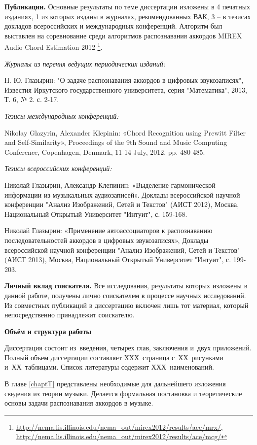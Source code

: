 \textbf{Публикации.} Основные результаты по теме диссертации изложены в 4
печатных изданиях, 1 из которых изданы в журналах, рекомендованных ВАК, 3 -- в
тезисах докладов всероссийских и международных конференций. Алгоритм был
выставлен на соревнование среди алгоритмов распознавания аккордов MIREX Audio
Chord Estimation 2012
\footnote{\url{http://nema.lis.illinois.edu/nema_out/mirex2012/results/ace/mrx/},
\url{http://nema.lis.illinois.edu/nema_out/mirex2012/results/ace/mcg/}}.

\textit{Журналы из перечня ведущих периодических изданий:}

Н. Ю. Глазырин: "О задаче распознавания аккордов в цифровых звукозаписях",
Известия Иркутского государственного университета, серия "Математика", 2013, Т.
6, № 2. с. 2-17.

\textit{Тезисы международных конференций:}

Nikolay Glazyrin, Alexander Klepinin: «Chord Recognition using Prewitt Filter
and Self-Similarity», Proceedings of the 9th Sound and Music Computing
Conference, Copenhagen, Denmark, 11-14 July, 2012, pp. 480-485.

\textit{Тезисы всероссийских конференций:}

Николай Глазырин, Александр Клепинин: «Выделение гармонической информации из
музыкальных аудиозаписей». Доклады всероссийской научной конференции "Анализ
Изображений, Сетей и Текстов" (АИСТ 2012), Москва, Национальный Открытый
Университет "Интуит", с. 159-168.

Николай Глазырин: «Применение автоассоциаторов к распознаванию
последовательностей аккордов в цифровых звукозаписях», Доклады всероссийской
научной конференции "Анализ Изображений, Сетей и Текстов" (АИСТ 2013), Москва,
Национальный Открытый Университет "Интуит", с. 199-203.

\textbf{Личный вклад соискателя.} Все исследования, результаты которых изложены
в данной работе, получены лично соискателем в процессе научных исследований. Из
совместных публикаций в диссертацию включен лишь тот материал, который
непосредственно принадлежит соискателю.

\textbf{Объём и структура работы}

Диссертация состоит из~введения, четырех глав, заключения и~двух приложений.
Полный объем диссертации составляет ХХХ~страница с~ХХ~рисунками и~ХХ~таблицами.
Список литературы содержит ХХХ~наименований.

В главе \ref{chaptT} представлены необходимые для дальнейшего изложения сведения
из теории музыки. Делается формальная постановка и теоретические основы задачи
распознавания аккордов в музыке.

